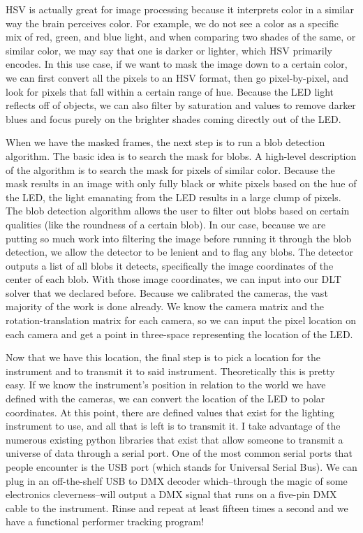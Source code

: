 \documentclass[12pt,twoside]{reedthesis}
\begin{document}
HSV is actually great for image processing because it interprets color in a similar way the brain perceives color. For example, we do not see a color as a specific mix of red, green, and blue light, and when comparing two shades of the same, or similar color, we may say that one is darker or lighter, which HSV primarily encodes. In this use case, if we want to mask the image down to a certain color, we can first convert all the pixels to an HSV format, then go pixel-by-pixel, and look for pixels that fall within a certain range of hue. Because the LED light reflects off of objects, we can also filter by saturation and values to remove darker blues and focus purely on the brighter shades coming directly out of the LED.

	When we have the masked frames, the next step is to run a blob detection algorithm. The basic idea is to search the mask for blobs. A high-level description of the algorithm is to search the mask for pixels of similar color. Because the mask results in an image with only fully black or white pixels based on the hue of the LED, the light emanating from the LED results in a large clump of pixels. The blob detection algorithm allows the user to filter out blobs based on certain qualities (like the roundness of a certain blob). In our case, because we are putting so much work into filtering the image before running it through the blob detection, we allow the detector to be lenient and to flag any blobs. The detector outputs a list of all blobs it detects, specifically the image coordinates of the center of each blob. With those image coordinates, we can input into our DLT solver that we declared before. Because we calibrated the cameras, the vast majority of the work is done already. We know the camera matrix and the rotation-translation matrix for each camera, so we can input the pixel location on each camera and get a point in three-space representing the location of the LED.
	
Now that we have this location, the final step is to pick a location for the instrument and to transmit it to said instrument. Theoretically this is pretty easy. If we know the instrument's position in relation to the world we have defined with the cameras, we can convert the location of the LED to polar coordinates. At this point, there are defined values that exist for the lighting instrument to use, and all that is left is to transmit it. I take advantage of the numerous existing python libraries that exist that allow someone to transmit a universe of data through a serial port. One of the most common serial ports that people encounter is the USB port (which stands for Universal Serial Bus). We can plug in an off-the-shelf USB to DMX decoder which–through the magic of some electronics cleverness–will output a DMX signal that runs on a five-pin DMX cable to the instrument. Rinse and repeat at least fifteen times a second and we have a functional performer tracking program!
\end{document}
